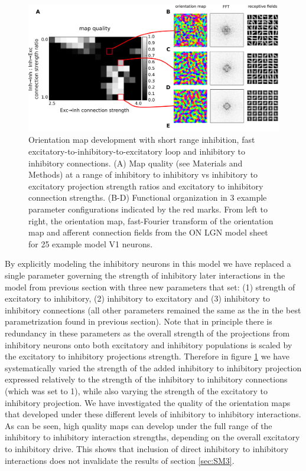 \documentclass[a4paper,10pt]{article}
\begin{document}
\begin{figure}[htpb!] 
\centering
\includegraphics[width=16cm]{./SVG/Figure2/figure2.png}
\caption{Orientation map development with short range inhibition, fast excitatory-to-inhibitory-to-excitatory loop and inhibitory to inhibitory connections. (A) Map quality (see Materials and Methods) at a range of 
inhibitory to inhibitory vs inhibitory to excitatory projection strength ratios and excitatory to inhibitory connection strengths. (B-D) Functional organization in 3 example parameter configurations 
indicated by the red marks. From left to right, the orientation map, fast-Fourier transform of the orientation map and afferent connection fields from the ON LGN model sheet for 25 example model V1 neurons. }
\label{fig:figure2}
\end{figure} 

By explicitly modeling the inhibitory neurons in this model we have replaced a single parameter governing the strength of inhibitory
later interactions in the model from previous section with three new parameters that set: (1) strength of excitatory to inhibitory,
(2) inhibitory to excitatory and (3) inhibitory to inhibitory connections (all other parameters remained the same as the 
in the best parametrization found in previous section). Note that in principle there is redundancy in these parameters as
the overall strength of the projections from inhibitory neurons onto both excitatory and inhibitory populations is scaled by the 
excitatory to inhibitory projections strength. Therefore in figure \ref{fig:figure2} we have systematically varied the strength of the added inhibitory to inhibitory
projection expressed relatively to the strength of the inhibitory to inhibitory connections (which was set to 1), while also varying the 
strength of the excitatory to inhibitory projection. We have  investigated the quality of the orientation 
maps that developed under these different levels of inhibitory to inhibitory interactions. As can be seen, high quality maps 
can develop under the full range of the inhibitory to inhibitory interaction strengths, depending on the overall 
excitatory to inhibitory drive. This shows that inclusion of direct inhibitory to inhibitory interactions does not 
invalidate the results of section \ref{sec:SM3}.
\end{document}
